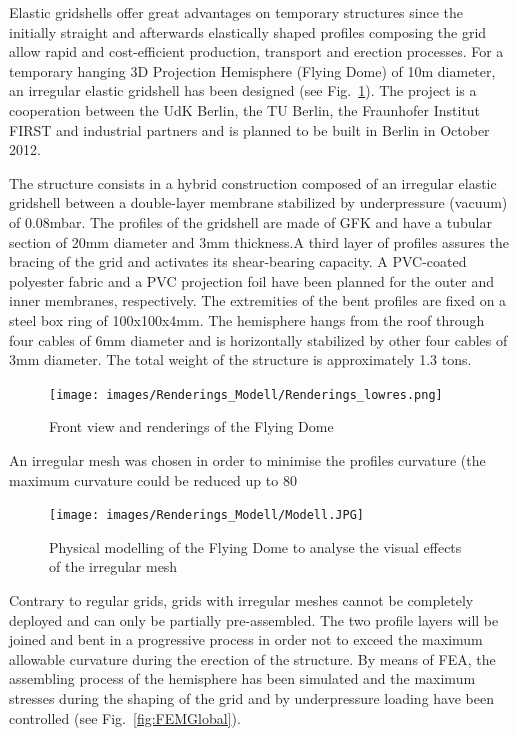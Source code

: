 \documentclass[Thesis.tex]{subfiles}
\begin{document}
Elastic gridshells offer great advantages on temporary structures since the initially straight and afterwards elastically shaped profiles composing the grid allow rapid and cost-efficient production, transport and erection processes. For a temporary hanging 3D Projection Hemisphere (Flying Dome) of 10m diameter, an irregular elastic gridshell has been designed (see Fig.~\ref{fig:Renderings}). The project is a cooperation between the UdK Berlin, the TU Berlin, the Fraunhofer Institut FIRST and industrial partners and is planned to be built in Berlin in October 2012.

The structure consists in a hybrid construction composed of an irregular elastic gridshell between a double-layer membrane stabilized by underpressure (vacuum) of 0.08mbar. The profiles of the gridshell are made of GFK and have a tubular section of 20mm diameter and 3mm thickness.A third layer of profiles assures the bracing of the grid and activates its shear-bearing capacity. A PVC-coated polyester fabric and a PVC projection foil have been planned for the outer and inner membranes, respectively. The extremities of the bent profiles are fixed on a steel box ring of 100x100x4mm. The hemisphere hangs from the roof through four cables of 6mm diameter and is horizontally stabilized by other four cables of 3mm diameter. The total weight of the structure is approximately 1.3 tons.

\begin{figure}
\centering
\texttt{[image: images/Renderings\_Modell/Renderings\_lowres.png]}
\caption{Front view and renderings of the Flying Dome}
\label{fig:Renderings}
\end{figure}

An irregular mesh was chosen in order to minimise the profiles curvature (the maximum curvature could be reduced up to 80%

\begin{figure}
\centering
\texttt{[image: images/Renderings\_Modell/Modell.JPG]}
\caption{Physical modelling of the Flying Dome to analyse the visual effects of the irregular mesh}
\label{fig:Modell}
\end{figure}

Contrary to regular grids, grids with irregular meshes cannot be completely deployed and can only be partially pre-assembled. The two profile layers will be joined and bent in a progressive process in order not to exceed the maximum allowable curvature during the erection of the structure. By means of FEA, the assembling process of the hemisphere has been simulated and the maximum stresses during the shaping of the grid and by underpressure loading have been controlled (see Fig.~\ref{fig:FEMGlobal}). 
\end{document}
